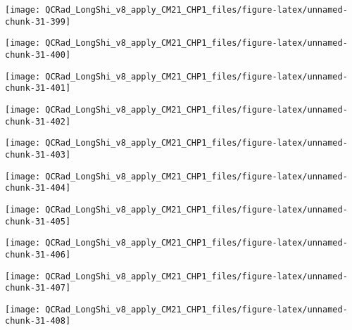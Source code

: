 \documentclass[
  10pt,
  a4paper,oneside]{article}
\begin{document}
\begin{center}\texttt{[image: QCRad\_LongShi\_v8\_apply\_CM21\_CHP1\_files/figure-latex/unnamed-chunk-31-399]} \end{center}

\begin{center}\texttt{[image: QCRad\_LongShi\_v8\_apply\_CM21\_CHP1\_files/figure-latex/unnamed-chunk-31-400]} \end{center}

\begin{center}\texttt{[image: QCRad\_LongShi\_v8\_apply\_CM21\_CHP1\_files/figure-latex/unnamed-chunk-31-401]} \end{center}

\begin{center}\texttt{[image: QCRad\_LongShi\_v8\_apply\_CM21\_CHP1\_files/figure-latex/unnamed-chunk-31-402]} \end{center}

\begin{center}\texttt{[image: QCRad\_LongShi\_v8\_apply\_CM21\_CHP1\_files/figure-latex/unnamed-chunk-31-403]} \end{center}

\begin{center}\texttt{[image: QCRad\_LongShi\_v8\_apply\_CM21\_CHP1\_files/figure-latex/unnamed-chunk-31-404]} \end{center}

\begin{center}\texttt{[image: QCRad\_LongShi\_v8\_apply\_CM21\_CHP1\_files/figure-latex/unnamed-chunk-31-405]} \end{center}

\begin{center}\texttt{[image: QCRad\_LongShi\_v8\_apply\_CM21\_CHP1\_files/figure-latex/unnamed-chunk-31-406]} \end{center}

\begin{center}\texttt{[image: QCRad\_LongShi\_v8\_apply\_CM21\_CHP1\_files/figure-latex/unnamed-chunk-31-407]} \end{center}

\begin{center}\texttt{[image: QCRad\_LongShi\_v8\_apply\_CM21\_CHP1\_files/figure-latex/unnamed-chunk-31-408]} \end{center}
\end{document}
